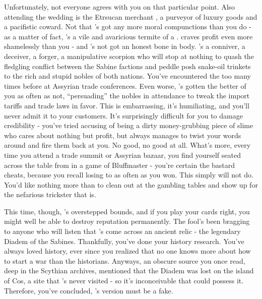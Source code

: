 \documentclass[char]{Kos}
\begin{document}
Unfortunately, not everyone agrees with you on that particular point. Also attending the wedding is the Etrsucan merchant \cMerchant{}, a purveyor of luxury goods and a pacifistic coward. Not that \cMerchant{}'s got any more moral compunctions than you do - as a matter of fact, \cMerchant{\they}'s a vile and avaricious termite of a \cMerchant{\human}. \cMerchant{\They} craves profit even more shamelessly than you - and \cMerchant{\they}'s not got an honest bone in \cMerchant{\their} body. \cMerchant{\They}'s a conniver, a deceiver, a forger, a manipulative scorpion who will stop at nothing to quash the fledgling conflict between the Sabine factions and peddle \cMerchant{\their} posh snake-oil trinkets to the rich and stupid nobles of both nations. You've encountered the \cMerchant{\human} too many times before at Assyrian trade conferences. Even worse, \cMerchant{\they}'s gotten the better of you as often as not, ``persuading'' the nobles in attendance to tweak the import tariffs and trade laws in \cMerchant{\their} favor. This is embarrassing, it's humiliating, and you'll never admit it to your customers. It's surprisingly difficult for you to damage \cMerchant{\their} credibility - you've tried accusing \cMerchant{\them} of being a dirty money-grubbing piece of slime who cares about nothing but profit, but \cMerchant{\they} always manages to twist your words around and fire them back at you. No good, no good at all. What's more, every time you attend a trade summit or Assyrian bazaar, you find yourself seated across the table from \cMerchant{\them} in a game of Bluffmaster - you're certain the bastard cheats, because you recall losing to \cMerchant{\them} as often as you won. This simply will not do. You'd like nothing more than to clean \cMerchant{} out at the gambling tables and show \cMerchant{\them} up for the nefarious trickster that \cMerchant{\they} is.

This time, though, \cMerchant{}'s overstepped \cMerchant{\their} bounds, and if you play your cards right, you might well be able to destroy \cMerchant{\their} reputation permanently. The fool's been bragging to anyone who will listen that \cMerchant{\they}'s come across an ancient relic - the legendary Diadem of the Sabines. Thankfully, you've done your history research. You've always loved history, ever since you realized that no one knows more about how to start a war than the historians. Anyways, an obscure source you once read, deep in the Scythian archives, mentioned that the Diadem was lost on the island of Cos, a site that \cMerchant{}'s never visited - so it's inconceivable that \cMerchant{\they} could possess it. Therefore, you've concluded, \cMerchant{}'s version must be a fake. 
\end{document}
